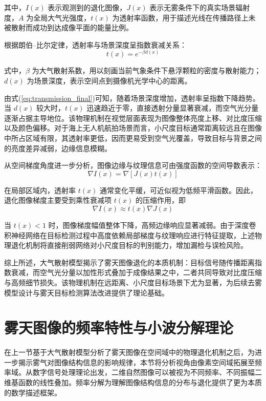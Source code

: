 其中，$I(x)$ 表示观测到的退化图像，$J(x)$ 表示无雾条件下的真实场景辐射度，$A$ 为全局大气光强度，$t(x)$ 为透射率函数，用于描述光线在传播路径上未被散射而成功到达成像平面的能量比例。

根据朗伯–比尔定律，透射率与场景深度呈指数衰减关系：
\begin{equation}
t(x) = e^{-\beta d(x)}
\label{eq:transmission_final}
\end{equation}

式中，$\beta$ 为大气散射系数，用以刻画当前气象条件下悬浮颗粒的密度与散射能力；$d(x)$ 为场景深度，表示空间点到摄像机光学中心的距离。

由式(\ref{eq:transmission_final})可知，随着场景深度增加，透射率呈指数下降趋势。当 $d(x)$ 较大时，$t(x)$ 迅速趋近于零，直接透射分量显著衰减，而空气光分量逐渐占据主导地位。该物理机制在视觉层面表现为图像整体亮度上移、对比度压缩以及颜色偏移。对于海上无人机航拍场景而言，小尺度目标通常距离较远且在图像中所占区域有限，其透射率更低，因而更易受到空气光覆盖，导致目标与背景之间的亮度差异减弱，边缘信息模糊。

从空间梯度角度进一步分析，图像边缘与纹理信息可由强度函数的空间导数表示：
\begin{equation}
\nabla I(x) = \nabla \left[ J(x) t(x) \right]
\label{eq:gradient_final}
\end{equation}

在局部区域内，透射率 $t(x)$ 通常变化平缓，可近似视为低频平滑函数。因此，退化图像梯度主要受到乘性衰减项 $t(x)$ 的压缩作用，即
\[
\nabla I(x) \approx t(x)\nabla J(x)
\]

当 $t(x) < 1$ 时，图像梯度幅值整体下降，高频边缘响应显著减弱。由于深度卷积神经网络在目标检测过程中高度依赖局部梯度与纹理响应进行特征提取，上述物理退化机制将直接削弱网络对小尺度目标的判别能力，增加漏检与误检风险。

综上所述，大气散射模型揭示了雾天图像退化的本质机制：目标信号随传播距离指数衰减，而空气光分量以加性形式叠加于成像结果之中，二者共同导致对比度压缩与高频细节损失。该物理机制在远距离、小尺度目标场景下尤为显著，为后续去雾模型设计与雾天目标检测算法改进提供了理论基础。


\section{雾天图像的频率特性与小波分解理论}

在上一节基于大气散射模型分析了雾天图像在空间域中的物理退化机制之后，为进一步揭示雾气对图像结构信息的影响规律，本节将分析视角由像素空间域拓展至频率域。从数字信号处理理论出发，二维自然图像可以被视为不同频率、不同振幅二维基函数的线性叠加。频率分解为理解图像结构信息的分布与退化提供了更为本质的数学描述框架。


